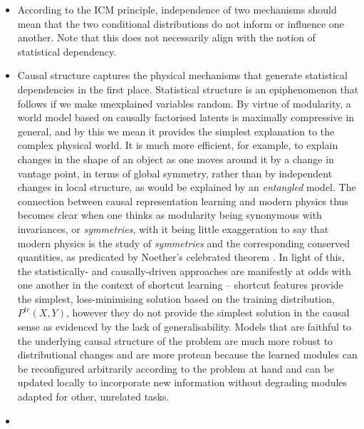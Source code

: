 \begin{itemize}
  \item 
    According to the ICM principle, independence of two mechanisms should mean  that the two
    conditional distributions do not inform or influence one another.
    Note that this does not necessarily align with the notion of statistical dependency.
  \item 
    Causal structure captures the physical mechanisms that generate statistical dependencies in
    the first place.
    Statistical structure is an epiphenomenon that follows if we make unexplained variables random.
    By virtue of modularity, a world model based on causally factorised latents is maximally
    compressive in general, and by this we mean it provides the simplest explanation to the complex
    physical world. 
    It is much more efficient, for example, to explain changes in the shape of an object as one
    moves around it by a change in vantage point, in terms of global symmetry, rather than by
    independent changes in local structure, as would be explained by an \emph{entangled} model.
    The connection between causal representation learning and modern physics thus becomes clear
    when one thinks as modularity being synonymous with invariances, or \emph{symmetries}, with it
    being little exaggeration to say that modern physics is the study of \emph{symmetries} and the
    corresponding conserved quantities, as predicated by Noether's celebrated theorem
    \citep{noether1918invariante}.
    In light of this, the statistically- and causally-driven approaches are manifestly at odds with
    one another in the context of shortcut learning -- shortcut features provide the simplest,
    loss-minimising solution based on the training distribution, \(P^{tr}(X, Y)\), however they do
    not provide the simplest solution in the causal sense as evidenced by the lack of
    generalisability.
    Models that are faithful to the underlying causal structure of the problem are much more robust
    to distributional changes and are more protean because the learned modules can be reconfigured
    arbitrarily according to the problem at hand and can be updated locally to incorporate new
    information without degrading modules adapted for other, unrelated tasks.
    \item

 \end{itemize}


